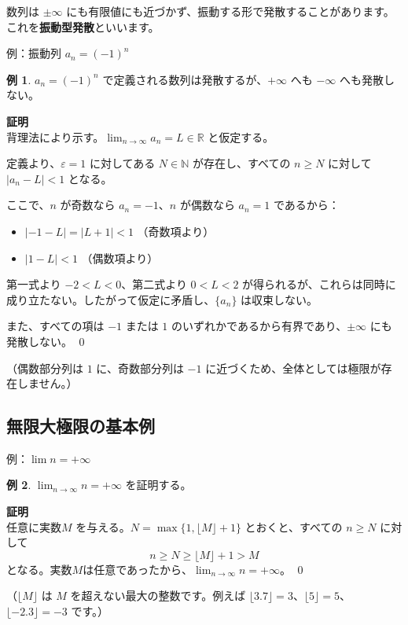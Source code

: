 \documentclass[11pt,a4paper]{jsarticle}
\theoremstyle{definition}
\newtheorem{example}{例}[section]
\newcommand{\N}{\mathbb{N}}
\newcommand{\R}{\mathbb{R}}
\newcommand{\eps}{\varepsilon}
\newcommand{\kaisetsu}[1]{\textcolor{darkblue!70!black}{\small（#1）}}
\begin{document}
数列は $\pm\infty$ にも有限値にも近づかず、振動する形で発散することがあります。これを\textbf{振動型発散}といいます。

\begin{examplebox}{例：振動列 $a_n = (-1)^n$}
\begin{example}\label{ex:shindou}
$a_n = (-1)^n$ で定義される数列は発散するが、$+\infty$ へも $-\infty$ へも発散しない。

\textbf{証明}\ \\
\noindent
背理法により示す。$\lim_{n \to \infty} a_n = L \in \R$ と仮定する。

定義より、$\eps = 1$ に対してある $N \in \N$ が存在し、すべての $n \geq N$ に対して $|a_n - L| < 1$ となる。

ここで、$n$ が奇数なら $a_n = -1$、$n$ が偶数なら $a_n = 1$ であるから：
\begin{itemize}[itemsep=0.1em]
\item $|-1 - L| = |L+1| < 1$ \kaisetsu{奇数項より}
\item $|1 - L| < 1$ \kaisetsu{偶数項より}
\end{itemize}

第一式より $-2 < L < 0$、第二式より $0 < L < 2$ が得られるが、これらは同時に成り立たない。したがって仮定に矛盾し、$\{a_n\}$ は収束しない。

また、すべての項は $-1$ または $1$ のいずれかであるから有界であり、$\pm\infty$ にも発散しない。 \qed
\end{example}
\kaisetsu{偶数部分列は $1$ に、奇数部分列は $-1$ に近づくため、全体としては極限が存在しません。}
\end{examplebox}

\subsection{無限大極限の基本例}

\begin{examplebox}{例：$\lim n = +\infty$}
\begin{example}\label{ex:n-infty}
$\displaystyle\lim_{n \to \infty} n = +\infty$ を証明する。

\textbf{証明}\ \\
\noindent
任意に実数$M$ を与える。$N = \max\{1, \lfloor M \rfloor + 1\}$ とおくと、すべての $n \geq N$ に対して
\[
n \geq N \geq \lfloor M \rfloor + 1 > M
\]
となる。実数$M$は任意であったから、$\displaystyle\lim_{n \to \infty} n = +\infty$。 \qed
\end{example}
\kaisetsu{$\lfloor M \rfloor$ は $M$ を超えない最大の整数です。例えば $\lfloor 3.7 \rfloor = 3$、$\lfloor 5 \rfloor = 5$、$\lfloor -2.3 \rfloor = -3$ です。}
\end{examplebox}
\end{document}
